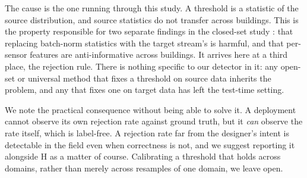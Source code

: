The cause is the one running through this study. A threshold is a statistic of the source
distribution, and source statistics do not transfer across buildings. This is the property
responsible for two separate findings in the closed-set study \cite{kbaier_closedset}:
that replacing batch-norm statistics with the target stream's is harmful, and that
per-sensor features are anti-informative across buildings. It arrives here at a third
place, the rejection rule. There is nothing specific to our detector in it: any open-set or
universal method that fixes a threshold on source data inherits the problem, and any that
fixes one on target data has left the test-time setting.

We note the practical consequence without being able to solve it. A deployment cannot
observe its own rejection rate against ground truth, but it \emph{can} observe the rate
itself, which is label-free. A rejection rate far from the designer's intent is detectable
in the field even when correctness is not, and we suggest reporting it alongside H as a
matter of course. Calibrating a threshold that holds across domains, rather than merely
across resamples of one domain, we leave open.
